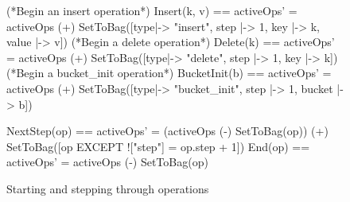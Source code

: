 \documentclass{uit-thesis}
\begin{document}
\begin{figure}
    \begin{tla}
        (*Begin an insert operation*)
        Insert(k, v) == activeOps' = activeOps (+) SetToBag({[type|-> "insert", step |-> 1, key |-> k, value |-> v]})
        (*Begin a delete operation*)
        Delete(k) == activeOps' = activeOps (+) SetToBag({[type|-> "delete", step |-> 1, key |-> k]})
        (*Begin a bucket_init operation*)
        BucketInit(b) == activeOps' = activeOps (+) SetToBag({[type|-> "bucket_init", step |-> 1, bucket |-> b]})
        
        NextStep(op) == activeOps' = (activeOps (-) SetToBag({op})) (+) SetToBag({[op EXCEPT !["step"] = op.step + 1]})
        End(op) == activeOps' = activeOps (-) SetToBag({op})
    \end{tla}
\begin{tlatex}
%
%
\@xx{}%
%
%
\@xx{}%
%
%
\@xx{}%
\@pvspace{8.0pt}%
\end{tlatex}
    \caption{Starting and stepping through operations}
    \label{fig:op-progress}
\end{figure}
\end{document}
